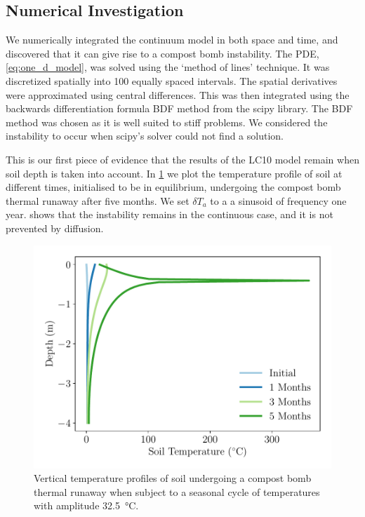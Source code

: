 \subsection{Numerical Investigation}
\label{sec:numerical_investigation}
We numerically integrated 
the continuum model in both space and time, and discovered that it can give rise to a compost bomb instability.
The PDE, \cref{eq:one_d_model}, was solved using the `method of lines' technique\cite{Schiesser2012}. It was discretized spatially into 100 equally spaced intervals.
The spatial derivatives were approximated using central differences. This was then integrated using
the backwards differentiation formula \textsc{BDF} method from the scipy library\cite{Virtanen2020}. The \textsc{BDF} method was chosen as it is well suited to stiff problems.
We considered the instability to occur when scipy's solver could not find a solution.

This is our first piece of evidence that the results of the LC10 model remain when soil depth is taken into account. In \cref{fig:vertical_profiles}
we plot the temperature profile of soil at different times, initialised to be in equilibrium, undergoing the compost bomb thermal runaway after five months.
We set $\delta T_a$ to a  a sinusoid of frequency one year.
 shows that the instability remains in the continuous case, and it is not prevented by diffusion.

\begin{figure}
  \centering
  \includegraphics[scale=0.5,keepaspectratio]{seasonal_cycle_profiles}
  \caption{Vertical temperature profiles of soil undergoing a compost bomb thermal runaway when subject to a seasonal cycle of temperatures with amplitude \SI{32.5}{\degreeCelsius}.}
  \label{fig:vertical_profiles}
\end{figure}
